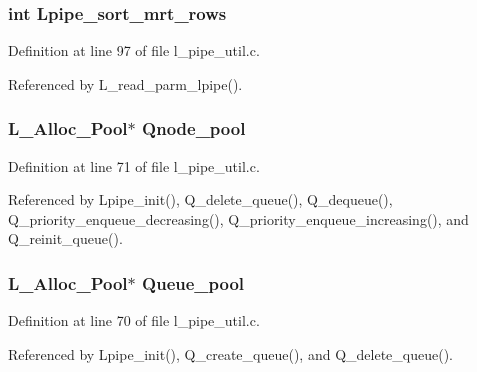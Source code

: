 \subsubsection{\setlength{\rightskip}{0pt plus 5cm}int \bf{Lpipe\_\-sort\_\-mrt\_\-rows}}\label{l__pipe__util_8h_1fd08397fdb9c8be171e9e45a1d811aa}




Definition at line 97 of file l\_\-pipe\_\-util.c.

Referenced by L\_\-read\_\-parm\_\-lpipe().
\subsubsection{\setlength{\rightskip}{0pt plus 5cm}L\_\-Alloc\_\-Pool$\ast$ \bf{Qnode\_\-pool}}\label{l__pipe__util_8h_b2b35dba38efd9d6e53512e38d014729}




Definition at line 71 of file l\_\-pipe\_\-util.c.

Referenced by Lpipe\_\-init(), Q\_\-delete\_\-queue(), Q\_\-dequeue(), Q\_\-priority\_\-enqueue\_\-decreasing(), Q\_\-priority\_\-enqueue\_\-increasing(), and Q\_\-reinit\_\-queue().
\subsubsection{\setlength{\rightskip}{0pt plus 5cm}L\_\-Alloc\_\-Pool$\ast$ \bf{Queue\_\-pool}}\label{l__pipe__util_8h_4a9d1f680824f7426e01b910d4cc2b03}




Definition at line 70 of file l\_\-pipe\_\-util.c.

Referenced by Lpipe\_\-init(), Q\_\-create\_\-queue(), and Q\_\-delete\_\-queue().